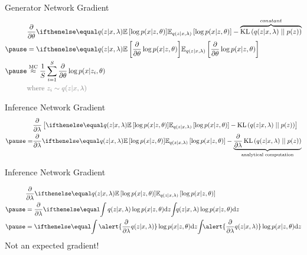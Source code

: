 \documentclass[14pt]{beamer}
\begin{document}
\begin{frame}{Generator Network Gradient}
\vspace{-10pt}
\begin{equation*}
\begin{aligned}
&\pdv{\theta}\E[q(z|x,\lambda)]{\log p(x|z,\theta)} - \overbrace{\KL{q(z|x,\lambda)}{p(z)}}^{constant} \\ \pause 
&=\E[q(z|x,\lambda)]{\pdv{\theta}\log p(x|z,\theta)} \\ \pause
&\overset{\text{MC}}{\approx} \frac{1}{S}\sum_{i=1}^{S}
\pdv{\theta} \log p(x|z_{i},\theta) \\
&\textcolor{gray}{\text{where }z_i \sim q(z|x, \lambda)}
\end{aligned}
\end{equation*}
\pause
{}
\end{frame}

\begin{frame}{Inference Network Gradient}
\begin{equation*}
\begin{aligned}
&\pdv{\lambda}\left[\E[q(z|x,\lambda)]{\log p(x|z,\theta)} - \KL{q(z|x,\lambda)}{p(z)} \right] \\ \pause
=&\pdv{\lambda}\E[q(z|x,\lambda)]{\log p(x|z,\theta)} - \underbrace{\pdv{\lambda}\KL{q(z|x,\lambda)}{p(z)}}_{\text{analytical computation}} \\
\end{aligned}
\end{equation*}
\pause
{}
\end{frame}

\begin{frame}{Inference Network Gradient}


\begin{equation*}
\begin{aligned}
&\pdv{\lambda}\E[q(z|x,\lambda)]{\log p(x|z,\theta)} \\ \pause
&= \pdv{\lambda} \intl{q(z|x,\lambda)\log p(x|z,\theta)}{z} \\ \pause
&= \intl{\alert{\pdv{\lambda} q(z|x,\lambda)}\log p(x|z,\theta)}{z}
\end{aligned}
\end{equation*}
\pause
Not an expected gradient!
\end{frame}
\end{document}

